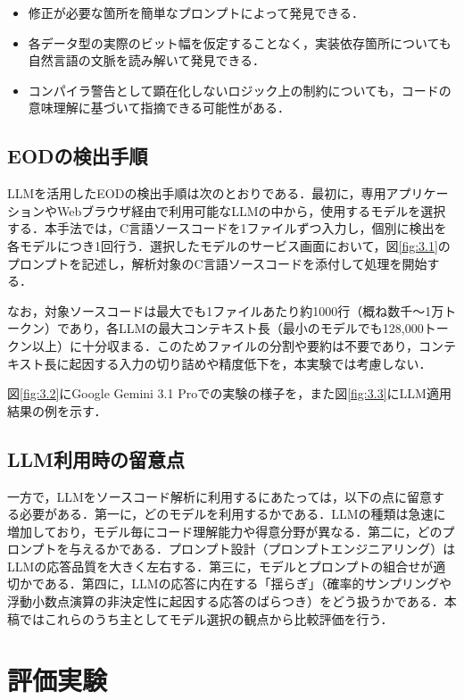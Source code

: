 \documentclass[submit,techrep,noauthor]{ipsj-lualatex}
\begin{document}
\begin{itemize}
	\item 修正が必要な箇所を簡単なプロンプトによって発見できる．
	\item 各データ型の実際のビット幅を仮定することなく，実装依存箇所についても自然言語の文脈を読み解いて発見できる．
	\item コンパイラ警告として顕在化しないロジック上の制約についても，コードの意味理解に基づいて指摘できる可能性がある．
\end{itemize}

\subsection{EODの検出手順}

LLMを活用したEODの検出手順は次のとおりである．最初に，専用アプリケーションやWebブラウザ経由で利用可能なLLMの中から，使用するモデルを選択する．本手法では，C言語ソースコードを1ファイルずつ入力し，個別に検出を各モデルにつき1回行う．選択したモデルのサービス画面において，図\ref{fig:3.1}のプロンプトを記述し，解析対象のC言語ソースコードを添付して処理を開始する．

なお，対象ソースコードは最大でも1ファイルあたり約1000行（概ね数千～1万トークン）であり，各LLMの最大コンテキスト長（最小のモデルでも128,000トークン以上）に十分収まる．このためファイルの分割や要約は不要であり，コンテキスト長に起因する入力の切り詰めや精度低下を，本実験では考慮しない．

図\ref{fig:3.2}にGoogle Gemini 3.1 Proでの実験の様子を，また図\ref{fig:3.3}にLLM適用結果の例を示す．

\subsection{LLM利用時の留意点}
\label{sec:LLM利用時の留意点}

一方で，LLMをソースコード解析に利用するにあたっては，以下の点に留意する必要がある．第一に，どのモデルを利用するかである．LLMの種類は急速に増加しており，モデル毎にコード理解能力や得意分野が異なる．第二に，どのプロンプトを与えるかである．プロンプト設計（プロンプトエンジニアリング）はLLMの応答品質を大きく左右する\cite{ref6}．第三に，モデルとプロンプトの組合せが適切かである．第四に，LLMの応答に内在する「揺らぎ」（確率的サンプリングや浮動小数点演算の非決定性に起因する応答のばらつき）をどう扱うかである\cite{ref7}．本稿ではこれらのうち主としてモデル選択の観点から比較評価を行う．

\section{評価実験}
\end{document}
